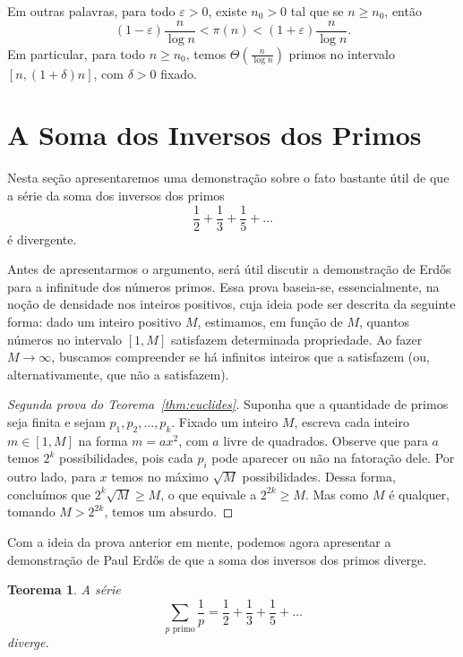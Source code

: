 \documentclass{hipatia}
\newtheorem{theorem*}{Teorema}
\begin{document}
Em outras palavras, para todo $\varepsilon>0$, existe $n_0>0$ tal que se $n \ge n_0$, então
\[(1-\varepsilon)\frac{n}{\log n} < \pi(n) < (1+\varepsilon)\frac{n}{\log n}.\]
Em particular, para todo $n \ge n_0$, temos $\Theta(\frac{n}{\log n})$ primos no intervalo $[n, (1+\delta)n]$, com $\delta>0$ fixado.

\section{A Soma dos Inversos dos Primos}

Nesta seção apresentaremos uma demonstração sobre o fato bastante útil de que a série da soma dos inversos dos primos
\[\frac{1}{2}+\frac{1}{3}+\frac{1}{5}+\ldots\]
é divergente.

Antes de apresentarmos o argumento, será útil discutir a demonstração de Erd\H{o}s para a infinitude dos números primos. Essa prova baseia-se, essencialmente, na noção de densidade nos inteiros positivos, cuja ideia pode ser descrita da seguinte forma: dado um inteiro positivo $M$, estimamos, em função de $M$, quantos números no intervalo $[1,M]$ satisfazem determinada propriedade. Ao fazer $M \to \infty$, buscamos compreender se há infinitos inteiros que a satisfazem (ou, alternativamente, que não a satisfazem).

\begin{proof}[Segunda prova do Teorema~\ref{thm:euclides}]
Suponha que a quantidade de primos seja finita e sejam $p_1, p_2, \ldots, p_k$. Fixado um inteiro $M$, escreva cada inteiro $m \in [1,M]$ na forma $m=ax^2$, com $a$ livre de quadrados. Observe que para $a$ temos $2^k$ possibilidades, pois cada $p_i$ pode aparecer ou não na fatoração dele. Por outro lado, para $x$ temos no máximo $\sqrt{M}$ possibilidades. Dessa forma, concluímos que $2^k\sqrt{M} \ge M$, o que equivale a $2^{2k} \ge M$. Mas como $M$ é qualquer, tomando $M>2^{2k}$, temos um absurdo.
\end{proof}

Com a ideia da prova anterior em mente, podemos agora apresentar a demonstração de Paul Erd\H{o}s de que a soma dos inversos dos primos diverge.

\begin{theorem*}
    A série
    \[\sum_{p\text{ primo}}\frac{1}{p}=\frac{1}{2}+\frac{1}{3}+\frac{1}{5}+\ldots\]
    diverge.
\end{theorem*}
\end{document}
